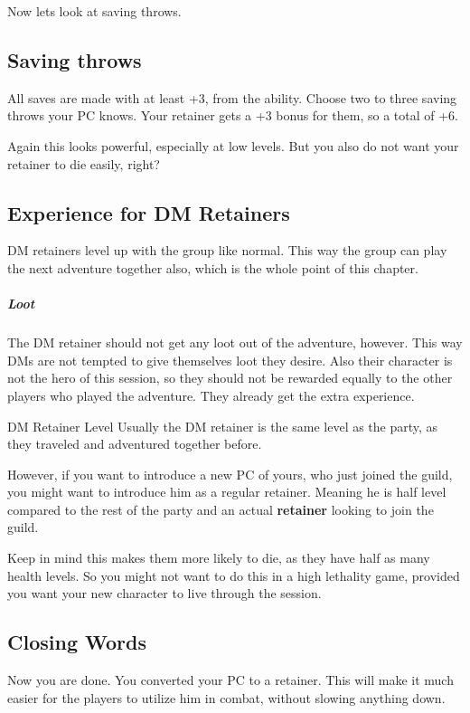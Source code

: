 \documentclass[letterpaper,10pt,twoside,twocolumn,openany]{book}
\begin{document}
Now lets look at saving throws.

\subsection{Saving throws}

All saves are made with at least +3, from the ability.
Choose two to three saving throws your PC knows.
Your retainer gets a +3 bonus for them, so a total of +6.

Again this looks powerful, especially at low levels.
But you also do not want your retainer to die easily, right?

\subsection{Experience for DM Retainers}

DM retainers level up with the group like normal.
This way the group can play the next adventure together also, which is the whole point of this chapter.

\subparagraph{Loot}
The DM retainer should not get any loot out of the adventure, however.
This way DMs are not tempted to give themselves loot they desire.
Also their character is not the hero of this session, so they should not be rewarded equally to the other players who played the adventure.
They already get the extra experience.

\begin{DndComment}{DM Retainer Level}
    Usually the DM retainer is the same level as the party, as they traveled and adventured together before.

    However, if you want to introduce a new PC of yours, who just joined the guild, you might want to introduce him as a regular retainer.
    Meaning he is half level compared to the rest of the party and an actual \textbf{retainer} looking to join the guild.

    Keep in mind this makes them more likely to die, as they have half as many health levels.
    So you might not want to do this in a high lethality game, provided you want your new character to live through the session.
\end{DndComment}

\subsection{Closing Words}

Now you are done.
You converted your PC to a retainer.
This will make it much easier for the players to utilize him in combat, without slowing anything down.
\end{document}
